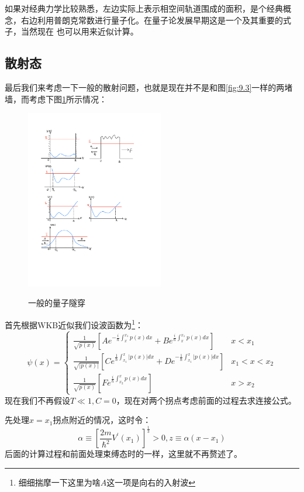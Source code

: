 \documentclass[a4paper,zihao=-4,linespread=1]{ctexrep}
\begin{document}
    如果对经典力学比较熟悉，左边实际上表示相空间轨道围成的面积，是个经典概念，右边利用普朗克常数进行量子化。在量子论发展早期这是一个及其重要的式子，当然现在
    也可以用来近似计算。


    \subsection*{散射态}
    最后我们来考虑一下一般的散射问题，也就是现在并不是和图\ref{fig:9.3}一样的两堵墙，而考虑下图\ref{fig:9.5}所示情况：
    \begin{figure}[h]
        \centering
        \includegraphics[width=6cm]{fig/9-5.pdf}
        \label{fig:9.5}
        \caption{一般的量子隧穿}
    \end{figure}
    
    首先根据WKB近似我们设波函数为\footnote{细细揣摩一下这里为啥$A$这一项是向右的入射波}：
    \begin{equation}
        \label{eq:9.25}
        \psi(x)=\begin{cases}
            \frac{1}{\sqrt{p(x)}}\left[Ae^{-\frac{i}{\hbar}\int_{x}^{x_1}p(x)dx}+Be^{\frac{i}{\hbar}\int_{x}^{x_1}p(x)dx}\right]& x<x_1\\
            \frac{1}{\sqrt{|p(x)|}}\left[Ce^{\frac{1}{\hbar}\int_{x_1}^{x}|p(x)|dx}+De^{-\frac{1}{\hbar}\int_{x_1}^{x}|p(x)|dx}\right]& x_1<x<x_2\\
            \frac{1}{\sqrt{p(x)}}\left[Fe^{\frac{i}{\hbar}\int_{x_2}^{x}p(x)dx}\right]&x>x_2
        \end{cases}
    \end{equation}
    现在我们不再假设$T\ll1,C=0$，现在对两个拐点考虑前面的过程去求连接公式。
    
    先处理$x=x_1$拐点附近的情况，这时令：
    \[\alpha\equiv\left[\frac{2m}{\hbar^2}V^\prime(x_1)\right]^{\frac{1}{3}}>0,z\equiv \alpha (x-x_1)\]    
    后面的计算过程和前面处理束缚态时的一样，这里就不再赘述了。
\end{document}
